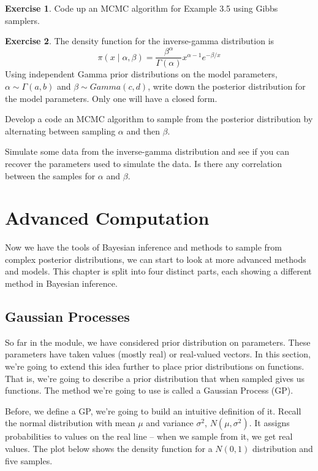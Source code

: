 \documentclass[
]{book}
\theoremstyle{definition}
\theoremstyle{definition}
\theoremstyle{definition}
\newtheorem{exercise}{Exercise}[chapter]
\theoremstyle{definition}
\theoremstyle{remark}
\begin{document}
\begin{exercise}
Code up an MCMC algorithm for Example 3.5 using Gibbs samplers.
\end{exercise}

\begin{exercise}
The density function for the inverse-gamma distribution is
\[
\pi(x\mid \alpha, \beta) = \frac{\beta^\alpha}{\Gamma(\alpha)}x^{\alpha - 1}e^{-\beta/x}
\]
Using independent Gamma prior distributions on the model parameters, \(\alpha \sim \Gamma(a, b)\) and \(\beta \sim Gamma(c, d)\), write down the posterior distribution for the model parameters. Only one will have a closed form.

Develop a code an MCMC algorithm to sample from the posterior distribution by alternating between sampling \(\alpha\) and then \(\beta\).

Simulate some data from the inverse-gamma distribution and see if you can recover the parameters used to simulate the data. Is there any correlation between the samples for \(\alpha\) and \(\beta\).
\end{exercise}

\hypertarget{advanced-computation}{%
\chapter{Advanced Computation}\label{advanced-computation}}

Now we have the tools of Bayesian inference and methods to sample from complex posterior distributions, we can start to look at more advanced methods and models. This chapter is split into four distinct parts, each showing a different method in Bayesian inference.

\hypertarget{gaussian-processes}{%
\section{Gaussian Processes}\label{gaussian-processes}}

So far in the module, we have considered prior distribution on parameters. These parameters have taken values (mostly real) or real-valued vectors. In this section, we're going to extend this idea further to place prior distributions on functions. That is, we're going to describe a prior distribution that when sampled gives us functions. The method we're going to use is called a Gaussian Process (GP).

Before, we define a GP, we're going to build an intuitive definition of it. Recall the normal distribution with mean \(\mu\) and variance \(\sigma^2\), \(N(\mu, \sigma^2)\). It assigns probabilities to values on the real line -- when we sample from it, we get real values. The plot below shows the density function for a \(N(0, 1)\) distribution and five samples.
\end{document}
